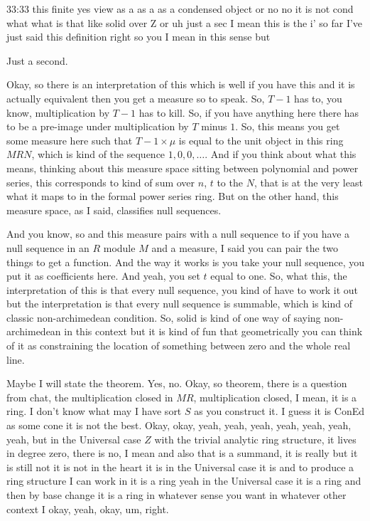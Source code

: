 \begin{unfinished}{33:33}
 this finite yes view as a as a as a condensed object or no no it is not cond what what is that like solid over Z or uh just a sec I mean this is the i' so far I've just said this definition right so you I mean in this sense but

Just a second.

Okay, so there is an interpretation of this which is well if you have this and it is actually equivalent then you get a measure so to speak. So, $T - 1$ has to, you know, multiplication by $T - 1$ has to kill. So, if you have anything here there has to be a pre-image under multiplication by $T$ minus $1$. So, this means you get some measure here such that $T - 1 \times \mu$ is equal to the unit object in this ring $MRN$, which is kind of the sequence $1, 0, 0, \ldots$. And if you think about what this means, thinking about this measure space sitting between polynomial and power series, this corresponds to kind of sum over $n$, $t$ to the $N$, that is at the very least what it maps to in the formal power series ring. But on the other hand, this measure space, as I said, classifies null sequences.

And you know, so and this measure pairs with a null sequence to if you have a null sequence in an $R$ module $M$ and a measure, I said you can pair the two things to get a function. And the way it works is you take your null sequence, you put it as coefficients here. And yeah, you set $t$ equal to one. So, what this, the interpretation of this is that every null sequence, you kind of have to work it out but the interpretation is that every null sequence is summable, which is kind of classic non-archimedean condition. So, solid is kind of one way of saying non-archimedean in this context but it is kind of fun that geometrically you can think of it as constraining the location of something between zero and the whole real line.

Maybe I will state the theorem. Yes, no. Okay, so theorem, there is a question from chat, the multiplication closed in $MR$, multiplication closed, I mean, it is a ring. I don't know what may I have sort $S$ as you construct it. I guess it is ConEd as some cone it is not the best. Okay, okay, yeah, yeah, yeah, yeah, yeah, yeah, yeah, but in the Universal case $Z$ with the trivial analytic ring structure, it lives in degree zero, there is no, I mean and also that is a summand, it is really but it is still not it is not in the heart it is in the Universal case it is and to produce a ring structure I can work in it is a ring yeah in the Universal case it is a ring and then by base change it is a ring in whatever sense you want in whatever other context I okay, yeah, okay, um, right. 


\end{unfinished}
